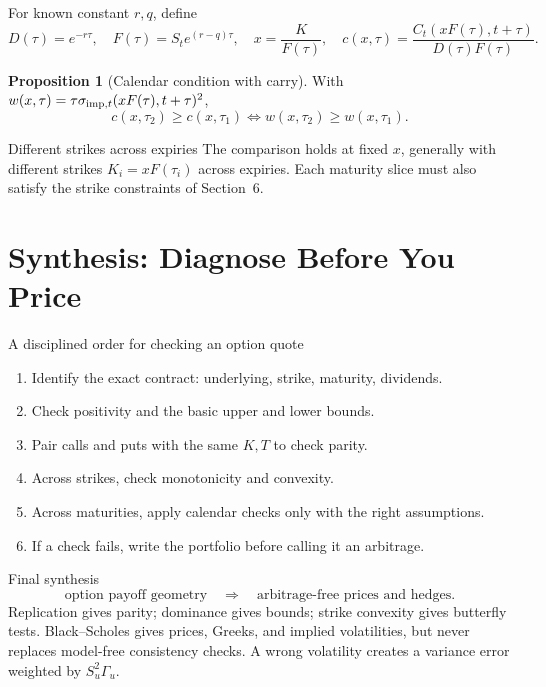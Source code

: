 \documentclass[10pt]{article}
\newcommand{\1}{\mathbf 1}
\theoremstyle{definition}
\newtheorem{proposition}[definition]{Proposition}
\begin{document}
For known constant \(r,q\), define
\[
D(\tau)=e^{-r\tau},\quad F(\tau)=S_te^{(r-q)\tau},\quad
x=\frac K{F(\tau)},\quad
c(x,\tau)=\frac{C_t(xF(\tau),t+\tau)}{D(\tau)F(\tau)}.
\]

\begin{proposition}[Calendar condition with carry]
With \(w(x,\tau)=\tau\sigma_{{\rm imp},t}(xF(\tau),t+\tau)^2\),
\[
\boxed{c(x,\tau_2)\ge c(x,\tau_1)\iff w(x,\tau_2)\ge w(x,\tau_1).}
\]
\end{proposition}

\begin{warningbox}{Different strikes across expiries}
The comparison holds at fixed \(x\), generally with different strikes
\(K_i=xF(\tau_i)\) across expiries. Each maturity slice must also satisfy the
strike constraints of Section~6.
\end{warningbox}

\section{Synthesis: Diagnose Before You Price}

\begin{keyidea}{A disciplined order for checking an option quote}
\begin{enumerate}
  \item Identify the exact contract: underlying, strike, maturity, dividends.
  \item Check positivity and the basic upper and lower bounds.
  \item Pair calls and puts with the same \(K,T\) to check parity.
  \item Across strikes, check monotonicity and convexity.
  \item Across maturities, apply calendar checks only with the right
        assumptions.
  \item If a check fails, write the portfolio before calling it an arbitrage.
\end{enumerate}
\end{keyidea}

\begin{keyidea}{Final synthesis}
\[
\boxed{\text{option payoff geometry}
\quad\Longrightarrow\quad
\text{arbitrage-free prices and hedges}.}
\]
Replication gives parity; dominance gives bounds; strike convexity gives
butterfly tests. Black--Scholes gives prices, Greeks, and implied
volatilities, but never replaces model-free consistency checks. A wrong
volatility creates a variance error weighted by \(S_u^2\Gamma_u\).
\end{keyidea}
\end{document}
